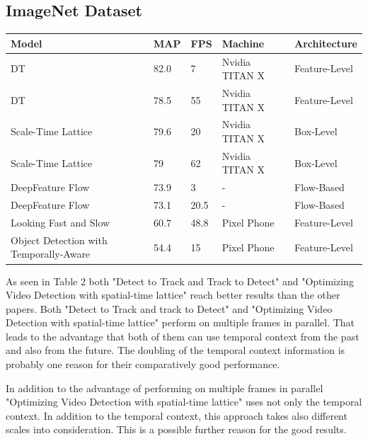 \documentclass[conference]{IEEEtran}
\begin{document}
\subsection{ImageNet Dataset}

\begin{tabular}{ | p{2cm} | p{2em}| p{2em} | p{4em} | p{5em} | } 
 \hline
 Model & MAP & FPS & Machine & Architecture \\
 \hline
 DT \cite{b8} & 82.0 & 7 & Nvidia TITAN X & Feature-Level \\
 \hline
 DT \cite{b8} & 78.5 & 55 & Nvidia TITAN X & Feature-Level \\
 \hline
 Scale-Time Lattice \cite{b10} & 79.6 & 20 & Nvidia TITAN X & Box-Level \\
 \hline
 Scale-Time Lattice \cite{b10} & 79 & 62 & Nvidia TITAN X & Box-Level \\
 \hline
 DeepFeature Flow \cite{b3} & 73.9 & 3 & - & Flow-Based \\
 \hline
 DeepFeature Flow \cite{b3} & 73.1 & 20.5 & - & Flow-Based \\
 \hline
 Looking Fast and Slow \cite{b7} & 60.7 & 48.8 & Pixel Phone & Feature-Level \\
 \hline
 Object Detection with Temporally-Aware \cite{b2} & 54.4 & 15 & Pixel Phone & Feature-Level \\
 \hline
\end{tabular} \newline

As seen in Table 2 both "Detect to Track and Track to Detect" and "Optimizing Video Detection with spatial-time lattice" reach better results than the other papers. Both "Detect to Track and track to Detect" and "Optimizing Video Detection with spatial-time lattice" perform on multiple frames in parallel. That leads to the advantage that both of them can use temporal context from the past and also from the future. The doubling of the temporal context information is probably one reason for their comparatively good performance. \newline

In addition to the advantage of performing on multiple frames in parallel "Optimizing Video Detection with spatial-time lattice" uses not only the temporal context. In addition to the temporal context, this approach takes also different scales into consideration. This is a possible further reason for the good results. \newline
\end{document}
